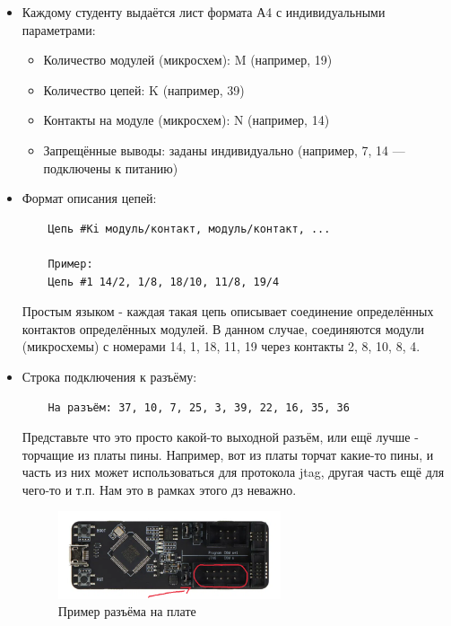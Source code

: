 \documentclass[a4paper, 12pt]{article}
\begin{document}
\begin{itemize}
	\item Каждому студенту выдаётся лист формата А4 с индивидуальными параметрами:
	      \begin{itemize}
		      \item Количество модулей (микросхем): M (например, 19)
		      \item Количество цепей: K (например, 39)
		      \item Контакты на модуле (микросхем): N (например, 14)
		      \item Запрещённые выводы: заданы индивидуально (например, 7, 14 — подключены к питанию)
	      \end{itemize}
	\item Формат описания цепей:
	      \begin{verbatim}
    Цепь #Ki модуль/контакт, модуль/контакт, ...

    Пример:
    Цепь #1 14/2, 1/8, 18/10, 11/8, 19/4
    \end{verbatim}

	      Простым языком - каждая такая цепь описывает соединение определённых контактов определённых модулей.
	      В данном случае, соединяются модули (микросхемы) с номерами 14, 1, 18, 11, 19 через контакты 2, 8, 10, 8, 4.

	\item Строка подключения к разъёму:
	      \begin{verbatim}
    На разъём: 37, 10, 7, 25, 3, 39, 22, 16, 35, 36
    \end{verbatim}

	      Представьте что это просто какой-то выходной разъём, или ещё лучше - торчащие из платы пины.
	      Например, вот из платы торчат какие-то пины, и часть из них может использоваться для протокола jtag, другая часть ещё для чего-то и т.п. Нам это в рамках этого дз неважно.

	      \begin{figure}[h!]
		      \centering
		      \includegraphics[width=0.62\textwidth]{docs/pinout.png}
		      \caption{Пример разъёма на плате}
	      \end{figure}
\end{itemize}
\end{document}
